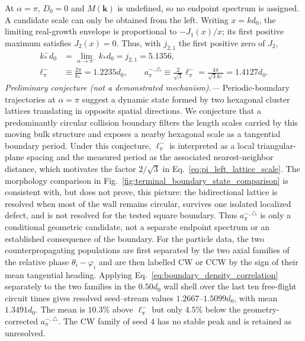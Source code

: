 \documentclass[11pt]{article}
\numberwithin{equation}{section}
\begin{document}
At $\alpha=\pi$, $D_0=0$ and $M(\mathbf k)$ is undefined, so no endpoint
spectrum is assigned.  A candidate scale can only be obtained from the left.
Writing $x=kd_0$, the limiting real-growth envelope is proportional to
$-J_1(x)/x$; its first positive maximum satisfies $J_2(x)=0$.  Thus, with $j_{2,1}$
the first positive zero of $J_2$,
\begin{equation}
  \begin{aligned}
  k_\ast^-d_0
  &=\lim_{\alpha\to\pi^-}k_\ast d_0=j_{2,1}=5.1356,\\
  \ell_\pi^-&\equiv\frac{2\pi}{k_\ast^-}=1.2235d_0,
  \qquad
  a_{\pi}^{-,\triangle}\equiv\frac{2}{\sqrt{3}}\ell_\pi^-
  =\frac{4\pi}{\sqrt{3}k_\ast^-}=1.4127d_0 .
  \end{aligned}
  \label{eq:pi_left_lattice_scale}
\end{equation}
\emph{Preliminary conjecture (not a demonstrated mechanism).---}
Periodic-boundary trajectories at $\alpha=\pi$ suggest a dynamic state formed
by two hexagonal cluster lattices translating in opposite spatial directions.
We conjecture that a predominantly circular collision boundary filters the
length scales carried by this moving bulk structure and exposes a nearby
hexagonal scale as a tangential boundary period.  Under this conjecture,
$\ell_\pi^-$ is interpreted as a local triangular-plane spacing and the
measured period as the associated nearest-neighbor distance, which motivates
the factor $2/\sqrt{3}$ in Eq.~\eqref{eq:pi_left_lattice_scale}.  The morphology
comparison in Fig.~\ref{fig:terminal_boundary_state_comparison} is consistent
with, but does not prove, this picture: the bidirectional lattice is resolved
when most of the wall remains circular, survives one isolated localized
defect, and is not resolved for the tested square boundary.  Thus
$a_{\pi}^{-,\triangle}$ is only a conditional geometric candidate, not a
separate endpoint spectrum or an established consequence of the boundary.
For the particle data, the two counterpropagating populations are first
separated by the two axial families of the relative phase
$\theta_i-\varphi_i$ and are then labelled CW or CCW by the sign of their mean
tangential heading.  Applying Eq.~\eqref{eq:boundary_density_correlation}
separately to the two families in the $0.50d_0$ wall shell over the last ten
free-flight circuit times gives resolved seed--stream values
$1.2667$--$1.5099d_0$, with mean $1.3491d_0$.  The mean is $10.3\%$ above
$\ell_\pi^-$ but only $4.5\%$ below the geometry-corrected
$a_{\pi}^{-,\triangle}$.  The CW family of seed $4$ has no stable peak and is
retained as unresolved.
\end{document}
